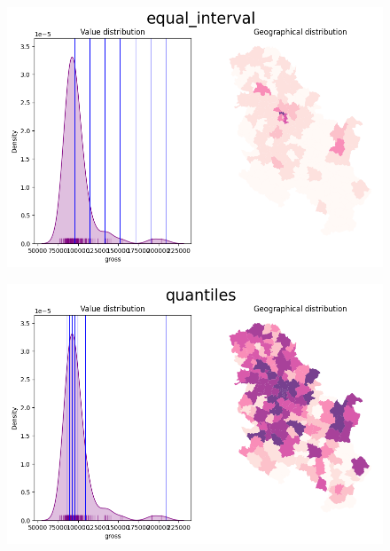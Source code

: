 \documentclass[
  letterpaper,
  DIV=11,
  numbers=noendperiod]{scrreprt}
\begin{document}
\begin{figure}[H]

{\centering \includegraphics{labs/w02_maps_files/figure-pdf/cell-35-output-1.png}

}

\end{figure}

\begin{figure}[H]

{\centering \includegraphics{labs/w02_maps_files/figure-pdf/cell-35-output-2.png}

}

\end{figure}
\end{document}
